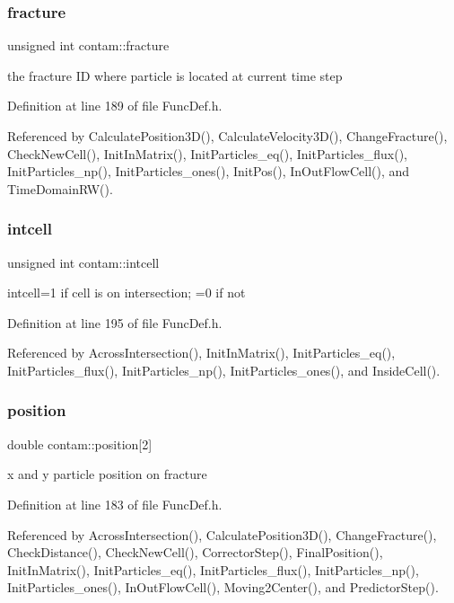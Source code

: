 \subsubsection{\texorpdfstring{fracture}{fracture}}
{\footnotesize\ttfamily unsigned int contam\+::fracture}

the fracture ID where particle is located at current time step 

Definition at line 189 of file Func\+Def.\+h.



Referenced by Calculate\+Position3\+D(), Calculate\+Velocity3\+D(), Change\+Fracture(), Check\+New\+Cell(), Init\+In\+Matrix(), Init\+Particles\+\_\+eq(), Init\+Particles\+\_\+flux(), Init\+Particles\+\_\+np(), Init\+Particles\+\_\+ones(), Init\+Pos(), In\+Out\+Flow\+Cell(), and Time\+Domain\+R\+W().

\mbox{\label{structcontam_a1747a7b7a63f22656afa1df6462279e8}} 
\subsubsection{\texorpdfstring{intcell}{intcell}}
{\footnotesize\ttfamily unsigned int contam\+::intcell}

intcell=1 if cell is on intersection; =0 if not 

Definition at line 195 of file Func\+Def.\+h.



Referenced by Across\+Intersection(), Init\+In\+Matrix(), Init\+Particles\+\_\+eq(), Init\+Particles\+\_\+flux(), Init\+Particles\+\_\+np(), Init\+Particles\+\_\+ones(), and Inside\+Cell().

\mbox{\label{structcontam_afdb17185baff7dc4f22cd6c76c6fd6fd}} 
\subsubsection{\texorpdfstring{position}{position}}
{\footnotesize\ttfamily double contam\+::position\mbox{[}2\mbox{]}}

x and y particle position on fracture 

Definition at line 183 of file Func\+Def.\+h.



Referenced by Across\+Intersection(), Calculate\+Position3\+D(), Change\+Fracture(), Check\+Distance(), Check\+New\+Cell(), Corrector\+Step(), Final\+Position(), Init\+In\+Matrix(), Init\+Particles\+\_\+eq(), Init\+Particles\+\_\+flux(), Init\+Particles\+\_\+np(), Init\+Particles\+\_\+ones(), In\+Out\+Flow\+Cell(), Moving2\+Center(), and Predictor\+Step().


